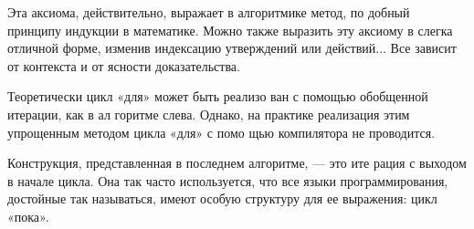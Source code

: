 Эта аксиома,  действительно,  выражает  в  алгоритмике  метод,  по­
добный принципу индукции в математике. Можно также выразить эту 
аксиому  в  слегка отличной форме,  изменив  индексацию  утверждений 
или действий... Все зависит от контекста и от ясности доказательства.

					\noindent Теоретически цикл «для» может быть реализо­
					ван с помощью обобщенной итерации, как в ал­
					горитме слева. Однако, на практике реализация 
						этим упрощенным методом цикла «для» с помо­
										щью компилятора не проводится.

\noindent Конструкция, представленная в последнем алгоритме, — это ите­
рация с выходом в начале цикла. Она так часто используется, что все 
языки программирования, достойные так называться, имеют особую 
структуру для ее выражения: цикл «пока».
\pagebreak
